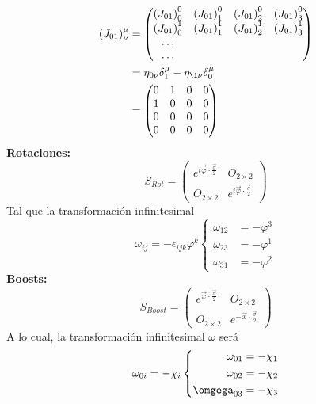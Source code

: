 \documentclass[../main.tex]{subfiles}
\begin{document}
 \begin{align*}
   \left( J_{01} \right)^\mu_\nu & = \begin{pmatrix}
     \left( J_{01} \right)^0_0 & \left(J_{01} \right)^0_1 & \left( J_{01} \right)^0_2 & \left( J_{01} \right)^0_3 \\
     \left( J_{01} \right)^1_0 & \left( J_{01} \right)^1_1 & \left( J_{01} \right)^1_2 & \left( J_{01} \right)^1_3 \\
     \dots \\
     \dots
   \end{pmatrix} \\
   & = \eta_{0\nu}\delta^\mu_1 - \eta_{\1\nu}\delta^\mu_0 \\
   & = \begin{pmatrix}
     0 & 1 & 0 & 0 \\ 1 & 0 & 0 & 0 \\ 0 & 0 & 0 & 0 \\ 0 & 0 & 0 & 0
   \end{pmatrix}
 \end{align*}
\textbf{Rotaciones:}
\begin{equation}
  S_{Rot}  = \begin{pmatrix}
    e^{i\vec{\varphi}\cdot \frac{\vec{\sigma}}{2}} & O_{2\times 2} \\ 
    O_{2\times 2} & e^{i\vec{\varphi}\cdot \frac{\vec{\sigma}}{2}}
  \end{pmatrix}
 \end{equation}
 Tal que la transformación infinitesimal
 \begin{equation}
   \omega_{ij} = -\epsilon_{ijk} \varphi^k\left\{ \begin{aligned}
     \omega_{12} & = -\varphi^3 \\
     \omega_{23} & = -\varphi^1 \\
     \omega_{31} & = -\varphi^2
   \end{aligned} \right.
  \end{equation}
  \textbf{Boosts:}
  \begin{equation}
    S_{Boost} = \begin{pmatrix}
      e^{\vec{x}\cdot \frac{\vec{\sigma}}{2}} & O_{2\times 2} \\
      O_{2\times 2} & e^{-\vec{x}\cdot \frac{\vec{\sigma}}{2}}
    \end{pmatrix}
   \end{equation}
A lo cual, la transformación infinitesimal $\omega$ será
\begin{equation}
  \omega_{0i} = -\chi_i \left\{ \begin{aligned}  \omega_{01} & = -\chi_1 \\
  \omega_{02} & = -\chi_2 \\
  \omgega_{03} & = -\chi_3
  \end{aligned} \right. 
 \end{equation}
\end{document}
